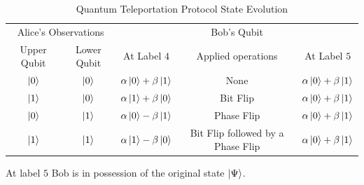 % 

\begin{table}

\begin{center}
\begin{tabular}{|cc|ccc|}
\multicolumn{2}{|c|}{Alice's Observations}  & \multicolumn{3}{c|}{Bob's Qubit} \\
Upper Qubit & Lower Qubit & At Label $4$ & Applied operations & At Label $5$\\
$\ket{0}$ & $\ket{0}$ & $\alpha\ket{0}+\beta\ket{1}$ & None& $\alpha\ket{0}+\beta\ket{1}$\\
$\ket{1}$ & $\ket{0}$ & $\alpha\ket{1}+\beta\ket{0}$ & Bit Flip& $\alpha\ket{0}+\beta\ket{1}$\\
$\ket{0}$ & $\ket{1}$ & $\alpha\ket{0}-\beta\ket{1}$ & Phase Flip& $\alpha\ket{0}+\beta\ket{1}$\\
$\ket{1}$ & $\ket{1}$ & $\alpha\ket{1}-\beta\ket{0}$ & Bit Flip followed by a Phase Flip& $\alpha\ket{0}+\beta\ket{1}$
\end{tabular}
\end{center}
\caption{Quantum Teleportation Protocol State Evolution}
\label{tab:qtelepregress}
\end{table}

At label $5$ Bob is in possession of the original state $\ket{\Psi}$.

% 


